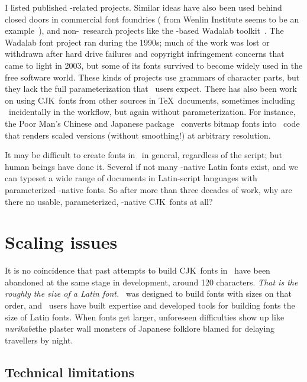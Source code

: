 \documentclass{ltugboat}
\def\CJK{CJK}
\begin{document}
I listed published \MF-related projects.  Similar ideas have also been used
behind closed
\linebreak%
 doors in commercial font foundries ( from Wenlin
Institute seems to be an example~\cite{Wenlin:CDL}), and non-\MF\ research
projects like the -based Wadalab toolkit~\cite{Tanaka:Wadalab}. 
The Wadalab font project ran during the 1990s; much of the work was lost or
withdrawn after hard drive failures and copyright infringement concerns that
came to light in 2003, but some of its fonts survived to become widely used
in the free software world.  These kinds of projects use grammars of
character parts, but they lack the full parameterization that \MF\ users
expect.  There has also been work on using \CJK\ fonts from other sources in
\TeX\ documents, sometimes including \MF\ incidentally in the workflow, but
again without parameterization.  For instance, the Poor Man's Chinese and
Japanese package~\cite{Ridgeway:Poor} converts bitmap fonts into \MF\ code
that renders scaled versions (without smoothing!) at arbitrary resolution.

It may be difficult to create fonts in \MF\ in general, regardless of the
script; but human beings have done it.  Several if not many \MF-native Latin
fonts exist, and we can typeset a wide range of
documents in Latin-script languages with
parameterized \MF-native fonts.  So after more than three decades of work,
why are there no usable, parameterized, \MF-native \CJK\ fonts at all?


\section{Scaling issues}

It is no coincidence that past attempts to build \CJK\ fonts in \MF\ have
been abandoned at the same stage in development, around 120 characters. 
\emph{That is the roughly the size of a Latin font.} \MF\ was designed to
build fonts with sizes on that order, and \MF\ users have built expertise
and developed tools for building fonts the size of Latin fonts.  When fonts
get larger, unforeseen difficulties show up like \emph{nurikabe}\Dash the
plaster wall monsters of Japanese folklore blamed for
delaying travellers by night.

\subsection{Technical limitations}
\end{document}
